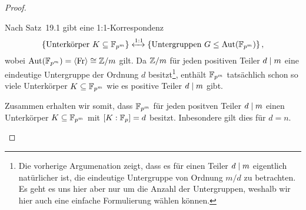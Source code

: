 \begin{proof}
\begin{itemize}[resume]
      Nach Satz~19.1 gibt eine 1:1-Korrespondenz
      \[
                              \{ \text{Unterkörper $K \subseteq \mathbb{F}_{p^m}$}  \}
        \xleftrightarrow{1:1} \{ \text{Untergruppen $G \leq \operatorname{Aut}(\mathbb{F}_{p^m})$} \}  \,,
      \]
      wobei $\operatorname{Aut}(\mathbb{F}_{p^m}) = \langle\operatorname{Fr}\rangle \cong \mathbb{Z}/m$ gilt.
      Da $\mathbb{Z}/m$ für jeden positiven Teiler $d \mathrel{|} m$ eine eindeutige Untergruppe der Ordnung $d$ besitzt\footnote{
      Die vorherige Argumenation zeigt, dass es für einen Teiler $d \mathrel{|} m$ eigentlich natürlicher ist, die eindeutige Untergruppe von Ordnung $m/d$ zu betrachten.
      Es geht es uns hier aber nur um die Anzahl der Untergruppen, weshalb wir hier auch eine einfache Formulierung wählen können.},
      enthält $\mathbb{F}_{p^m}$ tatsächlich schon so viele Unterkörper $K \subseteq \mathbb{F}_{p^m}$ wie es positive Teiler $d \mathrel{|} m$ gibt.
      
      Zusammen erhalten wir somit, dass $\mathbb{F}_{p^m}$ für jeden positven Teiler $d \mathrel{|} m$ einen Unterkörper $K \subseteq \mathbb{F}_{p^m}$ mit $[K : \mathbb{F}_{p}] = d$ besitzt.
      Inbesondere gilt dies für $d = n$.
  \qedhere
  \end{itemize}

\end{proof}

